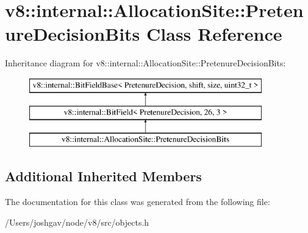 \hypertarget{classv8_1_1internal_1_1_allocation_site_1_1_pretenure_decision_bits}{}\section{v8\+:\+:internal\+:\+:Allocation\+Site\+:\+:Pretenure\+Decision\+Bits Class Reference}
\label{classv8_1_1internal_1_1_allocation_site_1_1_pretenure_decision_bits}
Inheritance diagram for v8\+:\+:internal\+:\+:Allocation\+Site\+:\+:Pretenure\+Decision\+Bits\+:\begin{figure}[H]
\begin{center}
\leavevmode
\includegraphics[height=3.000000cm]{classv8_1_1internal_1_1_allocation_site_1_1_pretenure_decision_bits}
\end{center}
\end{figure}
\subsection*{Additional Inherited Members}


The documentation for this class was generated from the following file\+:\begin{DoxyCompactItemize}
\item 
/\+Users/joshgav/node/v8/src/objects.\+h\end{DoxyCompactItemize}
